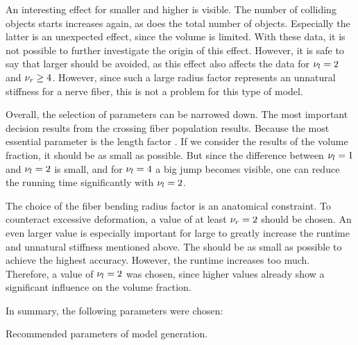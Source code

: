 An interesting effect for smaller \segLengthFactor{} and higher \segRadiusFactor{} is visible.
The number of colliding objects starts increases again, as does the total number of objects.
Especially the latter is an unexpected effect, since the volume is limited.
With these data, it is not possible to further investigate the origin of this effect.
However, it is safe to say that larger \segRadiusFactor{} should be avoided, as this effect also affects the data for $\textnormal{$\nu_{l}$} = 2$ and $\textnormal{$\nu_{r}$} \geq 4$.
However, since such a large radius factor represents an unnatural stiffness for a nerve fiber, this is not a problem for this type of model.
\par
%
Overall, the selection of parameters can be narrowed down.
The most important decision results from the crossing fiber population results.
Because the most essential parameter is the length factor \segLengthFactor{}.
If we consider the results of the volume fraction, it should be as small as possible.
But since the difference between $\textnormal{$\nu_{l}$}=\SI{1}{}$ and $\textnormal{$\nu_{l}$}=\SI{2}{}$ is small, and for $\textnormal{$\nu_{l}$}=\SI{4}{}$ a big jump becomes visible, one can reduce the running time significantly with $\textnormal{$\nu_{l}$}=\SI{2}{}$.
\par
%
The choice of the fiber bending radius factor \segRadiusFactor{} is an anatomical \dummy{} constraint.
To counteract excessive deformation, a value of at least $\textnormal{$\nu_{r}$} = \SI{2}{}$ should be chosen.
An even larger value is especially important for large \segLengthFactor{} to greatly increase the runtime and unnatural stiffness mentioned above.
The \segLengthFactor{} should be as small as possible to achieve the highest accuracy.
However, the runtime increases too much.
Therefore, a value of $\textnormal{$\nu_{l}$} = \SI{2}{}$ was chosen, since higher values already show a significant influence on the volume fraction.
\par
%
In summary, the following parameters were chosen:
%
\begin{table}[H]
%
\centering
\caption{Recommended parameters of model generation.}
\label{tab:parameterSetup}
\end{table}
